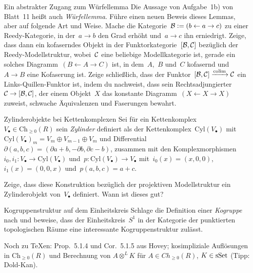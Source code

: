 \documentclass{uebblatt}
\newcommand{\Ch}{\mathrm{Ch}}
\newcommand{\Cyl}{\mathrm{Cyl}}
\begin{document}

\begin{aufgabe}{Ein abstrakter Zugang zum Würfellemma}
Die Aussage von Aufgabe~1b) von Blatt~11 heißt auch \emph{Würfellemma}. Führe
einen neuen Beweis dieses Lemmas, aber auf folgende Art und Weise. Mache die
Kategorie~$\mathcal{B} \vcentcolon= (b \leftarrow a \rightarrow c)$ zu einer Reedy-Kategorie,
in der~$a \to b$ den Grad erhöht und~$a \to c$ ihn erniedrigt. Zeige, dass dann
ein kofaserndes Objekt in der Funktorkategorie~$[\mathcal{B},\mathcal{C}]$ bezüglich der
Reedy-Modellstruktur, wobei~$\mathcal{C}$ eine beliebige Modellkategorie ist, gerade ein
solches Diagramm~$(B \leftarrow A \rightarrow C)$ ist, in dem~$A$,~$B$ und~$C$ kofasernd
und~$A \to B$ eine Kofaserung ist. Zeige schließlich, dass der Funktor~$[\mathcal{B},\mathcal{C}]
\xrightarrow{\operatorname*{colim}} \mathcal{C}$ ein Links-Quillen-Funktor ist, indem du nachweist, dass sein
Rechtsadjungierter~$\mathcal{C} \to [\mathcal{B},\mathcal{C}]$, der einem Objekt~$X$ das konstante
Diagramm~$(X \leftarrow X \rightarrow X)$ zuweist, schwache Äquivalenzen und
Faserungen bewahrt.
\end{aufgabe}

\begin{aufgabe}{Zylinderobjekte bei Kettenkomplexen}
Sei für ein Kettenkomplex~$V_\bullet \in \Ch_{\geq0}(R)$ sein \emph{Zylinder}
definiert als der Kettenkomplex~$\Cyl(V_\bullet)$ mit~$\Cyl(V_\bullet)_m = V_m
\oplus V_{m-1} \oplus V_m$ und Differential~$\partial(a,b,c) = (\partial a + b,
-\partial b, \partial c - b)$, zusammen mit den Komplexmorphismen~$i_0, i_1 :
V_\bullet \to \Cyl(V_\bullet)$ und~$p : \Cyl(V_\bullet) \to V_\bullet$
mit~$i_0(x) = (x,0,0)$, $i_1(x) = (0,0,x)$ und~$p(a,b,c) = a+c$.

Zeige, dass diese Konstruktion bezüglich der projektiven Modellstruktur ein
Zylinderobjekt von~$V_\bullet$ definiert. Wann ist dieses gut?
\end{aufgabe}

\begin{aufgabe}{Kogruppenstruktur auf dem Einheitskreis}
Schlage die Definition einer \emph{Kogruppe} nach und beweise, dass der
Einheitskreis~$S^1$ in der Kategorie der punktierten topologischen Räume
eine interessante Kogruppenstruktur zulässt.
\end{aufgabe}

Noch zu \TeX en: Prop.~5.1.4 und Cor.~5.1.5 aus Hovey; kosimpliziale
Auflösungen in $\Ch_{\geq0}(R)$ und Berechnung von $A \otimes^L K$
für $A \in Ch_{\geq0}(R)$, $K \in \mathrm{sSet}$ (Tipp: Dold-Kan).
\end{document}
